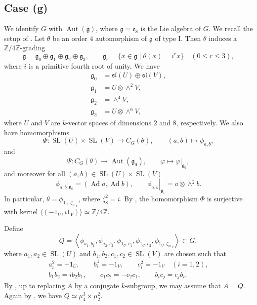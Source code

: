 \documentclass[12pt]{amsart}
\numberwithin{equation}{section}
\theoremstyle{remark}
\newcommand{\Ad}{\operatorname{Ad}}
\newcommand{\Aut}{\operatorname{Aut}}
\newcommand{\SL}{\operatorname{SL}}
\begin{document}
\subsection{Case (g)}
We identify $G$ with $\Aut(\mathfrak g)$, where $\mathfrak g =\mathfrak e_8$ is the Lie algebra of $G$. We recall the setup of \cite[Section 5, p.~8]{draper2017maximal}. Let $\theta$ be an order $4$ automorphism of $\mathfrak g$ of type I. Then $\theta$ induces a $\mathbb Z/4\mathbb Z$-grading
\[
        \mathfrak g
        =
        \mathfrak g_{0}\oplus
        \mathfrak g_{1}\oplus
        \mathfrak g_{2}\oplus
        \mathfrak g_{3},
        \qquad
        \mathfrak g_{r}
        =
        \{x\in\mathfrak g\mid \theta(x)=i^r x\} \quad(0\leq r\leq 3),
\]
where $i$ is a primitive fourth root of unity. We have
\begin{equation}
\label{eq:DE-type-I}
\begin{aligned}
        \mathfrak g_{0} &= \mathfrak{sl}(U)\oplus \mathfrak{sl}(V),\\
        \mathfrak g_{1} &= U\otimes \wedge^2 V,\\
        \mathfrak g_{2} &= \wedge^4 V,\\
        \mathfrak g_{3} &= U\otimes \wedge^6 V,
\end{aligned}
\end{equation}
where $U$ and $V$ are $k$-vector spaces of dimensions $2$ and $8$, respectively. We also have homomorphisms
\[
        \Phi\colon \SL(U)\times \SL(V)\longrightarrow C_G(\theta),
        \qquad
        (a,b)\longmapsto \phi_{a,b},
\]
and
\[
        \Psi\colon C_G(\theta)\longrightarrow \Aut(\mathfrak g_0),
        \qquad
        \varphi\longmapsto \varphi|_{\mathfrak g_0},
\]
and moreover for all $(a,b)\in \SL(U)\times \SL(V)$
\[
        \phi_{a,b}|_{\mathfrak g_0}=(\Ad a,\Ad b),
        \qquad
        \phi_{a,b}|_{\mathfrak g_1}=a\otimes \wedge^2 b.
\]
In particular, $\theta=\phi_{1_U,\zeta_81_V}$, where $\zeta_8^2=i$. By \cite[Lemma 5.1]{draper2017maximal}, the homomorphism $\Phi$ is surjective with kernel $\langle(-1_U,i1_V)\rangle\simeq \mathbb Z/4\mathbb Z$. 

Define
\begin{equation}
\label{eq.DE_Q_type_I}
        Q=
        \left\langle
        \phi_{a_1,b_1},
        \phi_{a_2,b_2},
        \phi_{1_U,c_1},
        \phi_{1_U,c_2},
        \phi_{1_U,\zeta_81_V}
        \right\rangle\subset G,
\end{equation}
where $a_1,a_2\in \SL(U)$ and $b_1,b_2,c_1,c_2\in \SL(V)$ are chosen such that
\begin{equation}
\label{eq.DE_type_I_relations}
\begin{gathered}
        a_i^2=-1_U,\qquad b_i^4=-1_V,\qquad c_i^2=-1_V
        \quad (i=1,2),\\
        b_1b_2=ib_2b_1,\qquad
        c_1c_2=-c_2c_1,\qquad
        b_i c_j=c_j b_i.
\end{gathered}
\end{equation}
By \cite[Theorem 5.2]{draper2017maximal}, up to replacing $A$ by a conjugate $k$-subgroup, we may assume that $A=Q$. Again by \cite[Theorem 5.2]{draper2017maximal}, we have $Q\simeq \mu_4^3\times \mu_2^2$.
\end{document}
